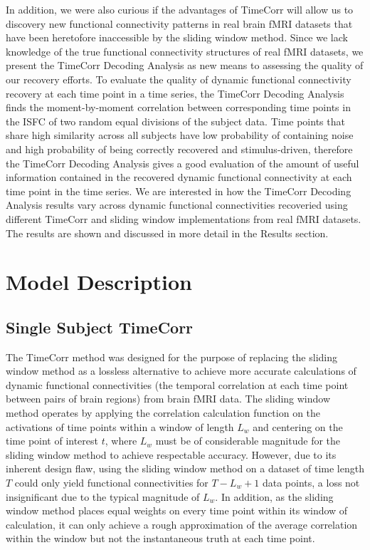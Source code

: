 \documentclass[11pt]{article}
\begin{document}
In addition, we were also curious if the advantages of TimeCorr will allow us to discovery new functional connectivity patterns in real brain fMRI datasets that have been heretofore inaccessible by the sliding window method. Since we lack knowledge of the true functional connectivity structures of real fMRI datasets, we present the TimeCorr Decoding Analysis as new means to assessing the quality of our recovery efforts. To evaluate the quality of dynamic functional connectivity recovery at each time point in a time series, the TimeCorr Decoding Analysis finds the moment-by-moment correlation between corresponding time points in the ISFC of two random equal divisions of the subject data. Time points that share high similarity across all subjects have low probability of containing noise and high probability of being correctly recovered and stimulus-driven, therefore the TimeCorr Decoding Analysis gives a good evaluation of the amount of useful information contained in the recovered dynamic functional connectivity at each time point in the time series. We are interested in how the TimeCorr Decoding Analysis results vary across dynamic functional connectivities recoveried using different TimeCorr and sliding window implementations from real fMRI datasets. The results are shown and discussed in more detail in the Results section.

\newpage
\section{Model Description}
\subsection{Single Subject TimeCorr}
The TimeCorr method was designed for the purpose of replacing the sliding window method as a lossless alternative to achieve more accurate calculations of dynamic functional connectivities (the temporal correlation at each time point between pairs of brain regions) from brain fMRI data. The sliding window method operates by applying the correlation calculation function on the activations of time points within a window of length $L_w$ and centering on the time point of interest $t$, where $L_w$ must be of considerable magnitude for the sliding window method to achieve respectable accuracy. However, due to its inherent design flaw, using the sliding window method on a dataset of time length $T$ could only yield functional connectivities for $T-L_w+1$ data points, a loss not insignificant due to the typical magnitude of $L_w$. In addition, as the sliding window method places equal weights on every time point within its window of calculation, it can only achieve a rough approximation of the average correlation within the window but not the instantaneous truth at each time point.
\end{document}
